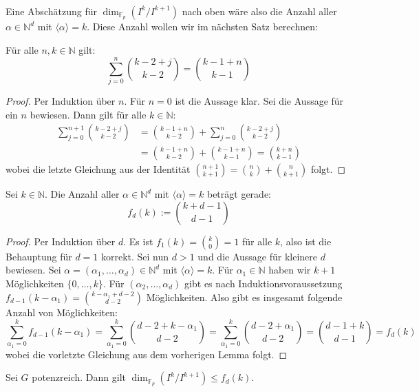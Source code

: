 \documentclass[11pt,a4paper,openany]{memoir}
\begin{document}
\paragraph{} Eine Abschätzung für $\dim_{\mathbb{F}_p}(I^k/I^{k+1})$ nach oben wäre also die Anzahl aller $\alpha\in\mathbb{N}^d$ mit $\langle\alpha\rangle =k$. Diese Anzahl wollen wir im nächsten Satz berechnen:

\begin{lemma}\label{Ex7.4Ex}
Für alle $n,k\in\mathbb{N}$ gilt:
\[\sum_{j=0}^n\binom{k-2+j}{k-2} =\binom{k-1+n}{k-1} \]
\end{lemma}

\begin{proof}
Per Induktion über $n$. Für $n=0$ ist die Aussage klar. Sei die Aussage für ein $n$ bewiesen. Dann gilt für alle $k\in\mathbb{N}$:
\begin{align*}
\sum_{j=0}^{n+1}\binom{k-2+j}{k-2} &=\binom{k-1+n}{k-2} + \sum_{j=0}^n\binom{k-2+j}{k-2}\\
&=\binom{k-1+n}{k-2} + \binom{k-1+n}{k-1}=\binom{k+n}{k-1}
\end{align*}
wobei die letzte Gleichung aus der Identität $\binom{n+1}{k+1}=\binom{n}{k}+\binom{n}{k+1}$ folgt.
\end{proof}

\begin{proposition}
Sei $k\in\mathbb{N}$. Die Anzahl aller $\alpha\in\mathbb{N}^d$ mit $\langle \alpha\rangle =k$ beträgt gerade:
\[f_d(k) := \binom{k+d-1}{d-1} \]
\end{proposition}

\begin{proof}
Per Induktion über $d$. Es ist $f_1(k)=\binom{k}{0}=1$ für alle $k$, also ist die Behauptung für $d=1$ korrekt. Sei nun $d> 1$ und die Aussage für kleinere $d$ bewiesen. Sei $\alpha=(\alpha_1,\ldots,\alpha_d)\in\mathbb{N}^d$ mit $\langle\alpha\rangle=k$. Für $\alpha_1\in\mathbb{N}$ haben wir $k+1$ Möglichkeiten $\{0,\ldots,k\}$. Für $(\alpha_2,\ldots,\alpha_d)$ gibt es nach Induktionsvoraussetzung $f_{d-1}(k-\alpha_1)=\binom{k-\alpha_1+d-2}{d-2}$ Möglichkeiten. Also gibt es insgesamt folgende Anzahl von Möglichkeiten:
\[\sum_{\alpha_1=0}^k f_{d-1}(k-\alpha_1)= \sum_{\alpha_1=0}^k \binom{d-2+k-\alpha_1}{d-2}=\sum_{\alpha_1=0}^k\binom{d-2+\alpha_1}{d-2}=\binom{d-1+k}{d-1}=f_d(k) \]
wobei die vorletzte Gleichung aus dem vorherigen Lemma folgt.
\end{proof}

\begin{corollary}\label{Ex7.4}
Sei $G$ potenzreich. Dann gilt $\dim_{\mathbb{F}_p}(I^k/I^{k+1})\leq f_d(k)$.
\end{corollary}
\end{document}
